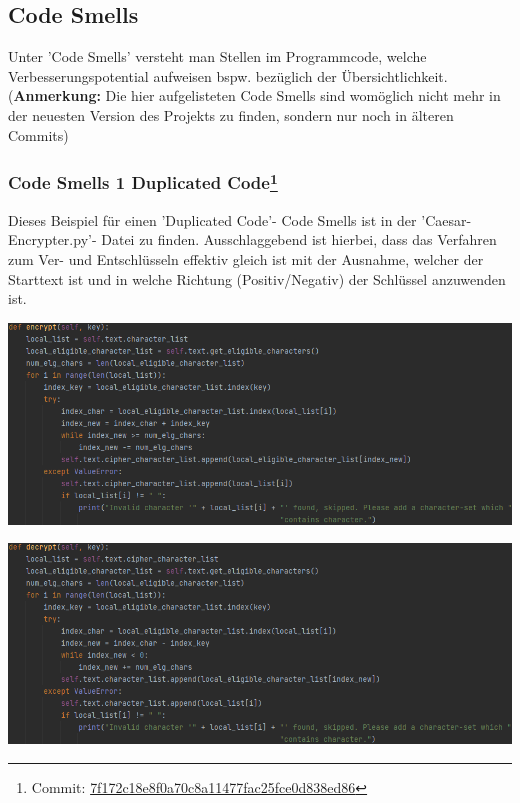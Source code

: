 \documentclass[12pt]{article}
\begin{document}
\subsection{Code Smells}
Unter 'Code Smells' versteht man Stellen im Programmcode, welche Verbesserungspotential aufweisen bspw. bezüglich der Übersichtlichkeit.\\ (\textbf{Anmerkung: }Die hier aufgelisteten Code Smells sind womöglich nicht mehr in der neuesten Version des Projekts zu finden, sondern nur noch in älteren Commits)

\subsubsection[Code Smells 1 Duplicated Code]{Code Smells 1 Duplicated Code\protect\footnote{Commit: \href{https://github.com/NicoSchrodt/EncryptionService/commit/7f172c18e8f0a70c8a11477fac25fce0d838ed86}{7f172c18e8f0a70c8a11477fac25fce0d838ed86}}}
Dieses Beispiel für einen 'Duplicated Code'- Code Smells ist in der 'Caesar-Encrypter.py'- Datei zu finden. Ausschlaggebend ist hierbei, dass das Verfahren zum Ver- und Entschlüsseln effektiv gleich ist mit der Ausnahme, welcher der Starttext ist und in welche Richtung (Positiv/Negativ) der Schlüssel anzuwenden ist.
\begin{center}
	\includegraphics[width=15cm]{bilder/CodeSmells1_a.png}
\end{center}
\begin{center}
	\includegraphics[width=15cm]{bilder/CodeSmells1_b.png}
\end{center}
\end{document}
